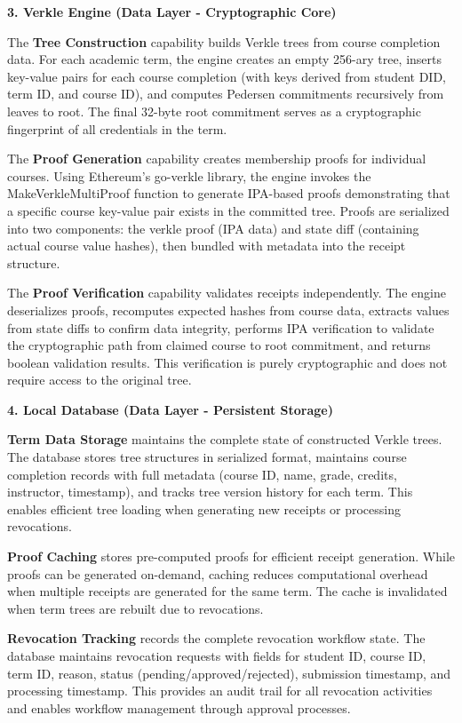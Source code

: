 \textbf{3. Verkle Engine (Data Layer - Cryptographic Core)}

The \textbf{Tree Construction} capability builds Verkle trees from course completion data. For each academic term, the engine creates an empty 256-ary tree, inserts key-value pairs for each course completion (with keys derived from student DID, term ID, and course ID), and computes Pedersen commitments recursively from leaves to root. The final 32-byte root commitment serves as a cryptographic fingerprint of all credentials in the term.

The \textbf{Proof Generation} capability creates membership proofs for individual courses. Using Ethereum's go-verkle library, the engine invokes the MakeVerkleMultiProof function to generate IPA-based proofs demonstrating that a specific course key-value pair exists in the committed tree. Proofs are serialized into two components: the verkle proof (IPA data) and state diff (containing actual course value hashes), then bundled with metadata into the receipt structure.

The \textbf{Proof Verification} capability validates receipts independently. The engine deserializes proofs, recomputes expected hashes from course data, extracts values from state diffs to confirm data integrity, performs IPA verification to validate the cryptographic path from claimed course to root commitment, and returns boolean validation results. This verification is purely cryptographic and does not require access to the original tree.

\textbf{4. Local Database (Data Layer - Persistent Storage)}

\textbf{Term Data Storage} maintains the complete state of constructed Verkle trees. The database stores tree structures in serialized format, maintains course completion records with full metadata (course ID, name, grade, credits, instructor, timestamp), and tracks tree version history for each term. This enables efficient tree loading when generating new receipts or processing revocations.

\textbf{Proof Caching} stores pre-computed proofs for efficient receipt generation. While proofs can be generated on-demand, caching reduces computational overhead when multiple receipts are generated for the same term. The cache is invalidated when term trees are rebuilt due to revocations.

\textbf{Revocation Tracking} records the complete revocation workflow state. The database maintains revocation requests with fields for student ID, course ID, term ID, reason, status (pending/approved/rejected), submission timestamp, and processing timestamp. This provides an audit trail for all revocation activities and enables workflow management through approval processes.


